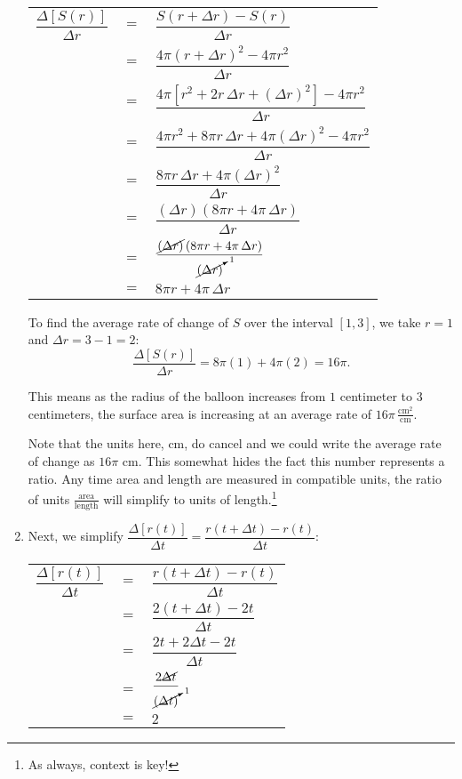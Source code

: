 \begin{ex}
\begin{enumerate}
\begin{longtable}{rcl}
 $\dfrac{\Delta[S(r)]}{\Delta r}$ & $=$ &$\dfrac{S(r+ \Delta r) - S(r)}{\Delta r}$   \\[10pt]
                       & $=$ &   $\dfrac{4 \pi (r + \Delta r)^2 - 4 \pi r^2}{\Delta r}$ \\[10pt]
                       & $=$ &$ \dfrac{4 \pi \left[r^2  + 2 r \, \Delta r + (\Delta r)^2\right] - 4 \pi r^2}{\Delta r}$ \\[10pt]   
                         &$=$ &    $\dfrac{4 \pi r^2  + 8 \pi  r \, \Delta r + 4 \pi (\Delta r)^2 - 4 \pi r^2}{\Delta r}$  \\[10pt]   
                         & $=$ &  $\dfrac{8 \pi  r \, \Delta r + 4 \pi (\Delta r)^2 }{\Delta r}$   \\[10pt]
                         & $=$ &  $\dfrac{(\Delta r) \left(8 \pi  r + 4 \pi \, \Delta r \right) }{\Delta r}$  \\[10pt]
                         & $=$ &  $\dfrac{\cancel{(\Delta r)} \left(8 \pi  r + 4 \pi \, \Delta r \right) }{\cancelto{1}{(\Delta r)}}$   \\[10pt]
                         & $=$ & $8 \pi r + 4 \pi \, \Delta r$ \\ \end{longtable}
                         
To find the average rate of change of $S$ over the interval $[1,3]$, we take $r = 1$ and $\Delta r = 3  - 1 = 2$: \[ \dfrac{\Delta[S(r)]}{\Delta r} = 8 \pi (1) + 4\pi (2) = 16 \pi.\]  

\medskip

This means as the radius of the balloon increases from $1$ centimeter to $3$ centimeters, the surface area is increasing at an average rate of  $16 \pi \, \frac{\text{cm}^2}{\text{cm}} $.

\medskip

Note that the units  here, cm, do cancel and we could write the average rate of change as  $16 \pi$ cm.  This somewhat hides the fact this number represents a ratio.  Any time area and length are measured in compatible units, the ratio of units $\frac{\text{area}}{\text{length}}$ will simplify to units of length.\footnote{As always, context is key!}


\item  Next, we simplify  $\dfrac{\Delta[r(t)]}{\Delta t} = \dfrac{r(t+ \Delta t) - r(t)}{\Delta t}$:

\begin{longtable}{rcl}

$ \dfrac{\Delta[r(t)]}{\Delta t}$ & $=$ & $\dfrac{r(t+ \Delta t) - r(t)}{\Delta t}$ \\[10pt]
                          &$=$ &   $\dfrac{2(t+\Delta t)- 2t}{\Delta t}$ \\[10pt]
                                  & $=$ &   $\dfrac{2t + 2 \Delta t - 2t}{\Delta t}$ \\[10pt]
                                     & $=$ &   $\dfrac{ 2 \cancel{\Delta t} }{\cancelto{1}{(\Delta t)}}$ \\[10pt]
                         &$=$ &    $2$ \\ \end{longtable}
                         

\end{enumerate}
\end{ex}
